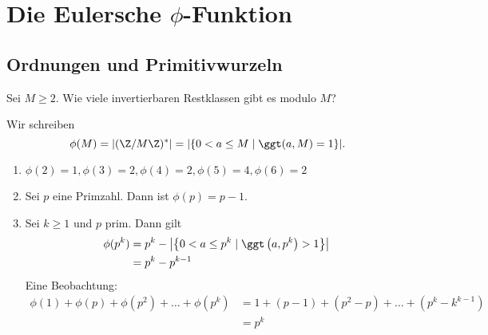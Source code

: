 \chapter{Die Eulersche $\phi$-Funktion}

\section*{Ordnungen und Primitivwurzeln}

\begin{frage*}
	Sei $M \geq 2$. Wie viele invertierbaren Restklassen gibt es modulo $M$?
\end{frage*}

\begin{notat*}
	Wir schreiben
	\[ \phi(M) = |(\Z/M\Z)^*| = |\{0 < a \leq M \mid \ggt(a,M) = 1\}|. \]
\end{notat*}

\begin{exmp*}
	\begin{enumerate}[label={\roman*})]
		\item $\phi(2) = 1, \phi(3)=2, \phi(4)=2, \phi(5)=4, \phi(6)=2$\\
		\item Sei $p$ eine Primzahl. Dann ist $\phi(p) = p-1$.
		\item Sei $k \geq 1$ und $p$ prim. Dann gilt
			\begin{align*}
				\phi(p^k) &= p^k - \left|\left\{0 < a \leq p^k \mid \ggt\left(a,p^k\right)>1\right\}\right|\\
				&= p^k - p^{k-1}
			\end{align*}
			Eine Beobachtung:
			\begin{align*}
				\phi(1) + \phi(p) + \phi(p^2) + \dots + \phi(p^k) &= 1 + (p-1) + (p^2-p) + \dots + (p^k-k^{k-1}) \\
				&= p^k
			\end{align*}
	\end{enumerate}
\end{exmp*}


